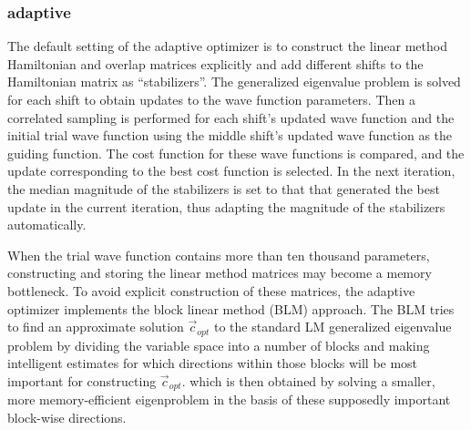 \subsubsection{adaptive}

The default setting of the adaptive optimizer is to construct the linear method Hamiltonian and overlap matrices explicitly and add different shifts to the Hamiltonian matrix 
as ``stabilizers''.
The generalized eigenvalue problem is solved for each shift to obtain updates to the wave function parameters.
Then a correlated sampling is performed for each shift's updated wave function and the initial trial wave function
using the middle shift's updated wave function as the guiding function.
The cost function for these wave functions is compared, and the update corresponding to the best cost function is selected.
In the next iteration, the median magnitude of the stabilizers is set to that that generated the best update in the current iteration, thus adapting the magnitude of
the stabilizers automatically.

When the trial wave function contains more than ten thousand parameters, constructing and storing the linear method matrices may become a memory bottleneck. 
To avoid explicit construction of these matrices, the adaptive optimizer implements the block linear method (BLM) approach. \cite{Zhao:2017:blocked_lm}
The BLM tries to find an approximate 
solution $\vec{c}_{opt}$ to the standard LM generalized eigenvalue problem by dividing the variable space into a number of blocks
and making intelligent estimates for which directions within those blocks will be most important for constructing $\vec{c}_{opt}$.
which is then obtained by solving a smaller, more memory-efficient 
eigenproblem in the basis of these supposedly important block-wise directions. 

